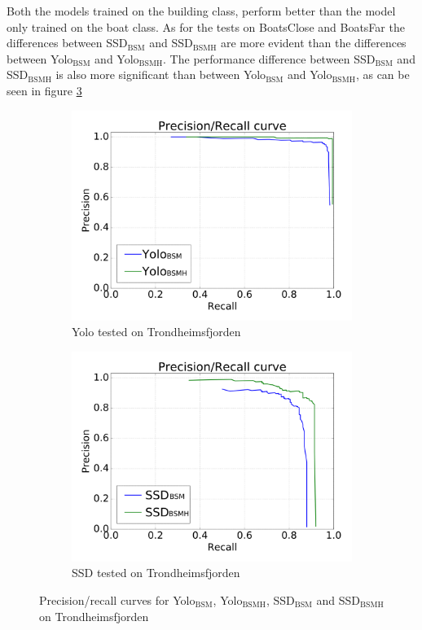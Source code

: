 \vspace{3mm}

Both the models trained on the building class, perform better than the model only trained on the boat class. As for the tests on BoatsClose and BoatsFar the differences between SSD$_{\text{BSM}}$ and SSD$_{\text{BSMH}}$ are more evident than the differences between Yolo$_{\text{BSM}}$ and Yolo$_{\text{BSMH}}$. The performance difference between SSD$_{\text{BSM}}$ and SSD$_{\text{BSMH}}$ is also more significant than between Yolo$_{\text{BSM}}$ and Yolo$_{\text{BSMH}}$, as can be seen in figure \ref{fig:trf_prec}


\begin{figure}[h!]
\begin{subfigure}{.5\textwidth}
  \centering
  \includegraphics[width=0.8\linewidth]{results/case_buildings/prec_recall/yolo/trf-eps.png}
  \caption{Yolo tested on Trondheimsfjorden}
  \label{fig:ex_trf_prec_rec_yolo}
\end{subfigure}%
\begin{subfigure}{.5\textwidth}
  \centering
  \includegraphics[width=.8\linewidth]{results/case_buildings/prec_recall/ssd/trf-eps.png}
  \caption{SSD tested on Trondheimsfjorden}
  \label{fig:ex_trf_prec_rec_ssd}
\end{subfigure}
\caption{Precision/recall curves for Yolo$_{\text{BSM}}$, Yolo$_{\text{BSMH}}$, SSD$_{\text{BSM}}$ and SSD$_{\text{BSMH}}$ on Trondheimsfjorden}
\label{fig:trf_prec}
\end{figure}

